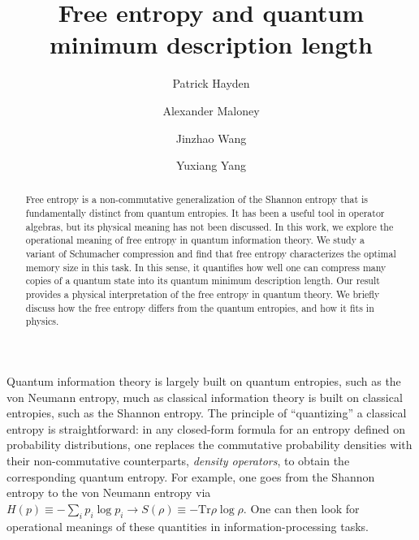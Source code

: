 \documentclass[aps,pre,twocolumn,superscriptaddress,amsmath,amssymb,reprint]{revtex4-2}
\newcommand*{\Tr}{\mathrm{Tr}}
\begin{document}
\title{Free entropy and quantum minimum description length}
\author{Patrick Hayden}
 \author{Alexander Maloney}
\author{Jinzhao Wang}
\author{Yuxiang Yang}
 
\begin{abstract}
Free entropy is a non-commutative generalization of the Shannon entropy that is fundamentally distinct from quantum entropies. It has been a useful tool in operator algebras, but its physical meaning has not been discussed. In this work, we explore the operational meaning of free entropy in quantum information theory. We study a variant of Schumacher compression and find that free entropy characterizes the optimal memory size in this task. In this sense, it quantifies how well one can compress many copies of a quantum state into its quantum minimum description length. Our result provides a physical interpretation of the free entropy in quantum theory. We briefly discuss how the free entropy differs from the quantum entropies, and how it fits in physics.
\end{abstract}



\maketitle


Quantum information theory is largely built on quantum entropies, such as the von Neumann entropy, much as classical information theory is built on classical entropies, such as the Shannon entropy. The principle of ``quantizing'' a classical entropy is straightforward: in any closed-form formula for an entropy defined on probability distributions, one replaces the commutative probability densities with their non-commutative counterparts, \emph{density operators}, to obtain the corresponding quantum entropy. For example, one goes from the Shannon entropy to the von Neumann entropy via $H( p)\equiv-\sum_i p_i\log p_i\rightarrow S(\rho) \equiv -\Tr \rho\log \rho.$ One can then look for operational meanings of these quantities in information-processing tasks.
\end{document}

